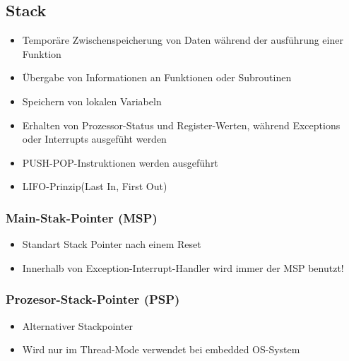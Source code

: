 \subsection{Stack}
\begin{multicols}{2}
    \begin{minipage}{0.5\textwidth}
        \begin{itemize}
            \item Temporäre Zwischenspeicherung von Daten während der ausführung einer Funktion
            \item Übergabe von Informationen an Funktionen oder Subroutinen
            \item Speichern von lokalen Variabeln
            \item Erhalten von Prozessor-Status und Register-Werten, während Exceptions oder Interrupts ausgefüht werden
            \item PUSH-POP-Instruktionen werden ausgeführt
            \item LIFO-Prinzip(Last In, First Out)
        \end{itemize}
    \end{minipage}
    
    \begin{minipage}{0.5\textwidth}
        \subsubsection{Main-Stak-Pointer (MSP)}
        \begin{itemize}
            \item Standart Stack Pointer nach einem Reset
            \item Innerhalb von Exception-Interrupt-Handler wird immer der MSP benutzt!
            \end{itemize}
        \subsubsection{Prozesor-Stack-Pointer (PSP)}
        \begin{itemize}
            \item Alternativer Stackpointer
            \item Wird nur im Thread-Mode verwendet
            \subitem \rightarrow bei embedded OS-System
        \end{itemize}   
    \end{minipage}
\end{multicols}

















